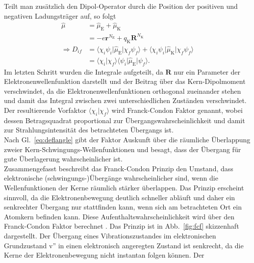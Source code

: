 Teilt man zusätzlich den Dipol-Operator durch die Position der positiven und negativen Ladungsträger auf,
so folgt
\begin{align}
    \hat{\mu}          & = \hat{\mu}_{\text{E}} + \hat{\mu}_{\text{K}}                                                          \\
                       & = -e\mathbf{r}^{N_{\text{E}}} + q_{\text{K}}\mathbf{R}^{N_{\text{K}}}                                  \\
    \Rightarrow D_{if} & = \langle\chi_{i}\psi_{i}\vert \hat{\mu}_{\text{E}} \vert\chi_{f}\psi_{f}\rangle +
    \langle\chi_{i}\psi_{i}\vert \hat{\mu}_{\text{K}} \vert\chi_{f}\psi_{f}\rangle                                              \\
                       & = \langle\chi_{i}\vert \chi_{f}\rangle \langle \psi_{i}\vert \hat{\mu}_{\text{E}}\vert\psi_{f}\rangle.
\end{align}
Im letzten Schritt wurden die Integrale aufgeteilt, da $\mathbf{R}$ nur ein Parameter der Elektronenwellenfunktion
darstellt und der Beitrag über das Kern-Dipolmoment verschwindet, da die Elektronenwellenfunktionen
orthogonal zueinander stehen und damit das Integral zwischen zwei unterschiedlichen Zuständen verschwindet. \\
Der resultierende Vorfaktor $\langle\chi_{i}\vert \chi_{f}\rangle$ wird Franck-Condon Faktor genannt,
wobei dessen Betragsquadrat proportional zur Übergangswahrscheinlichkeit und damit zur Strahlungsintensität
des betrachteten Übergangs ist. \\
Nach Gl.~\eqref{eq:deflangle} gibt der Faktor Auskunft über die räumliche Überlappung zweier Kern-Schwingungs-Wellenfunktionen
und besagt, dass der Übergang für gute Überlagerung wahrscheinlicher ist. \\
Zusammengefasst beschreibt das Franck-Condon Prinzip den Umstand, dass elektronische (schwingungs-)Übergänge
wahrscheinlicher sind, wenn die Wellenfunktionen der Kerne räumlich stärker überlappen. Das Prinzip erscheint sinnvoll,
da die Elektronenbewegung deutlich schneller abläuft und daher ein senkrechter Übergang nur stattfinden kann,
wenn sich am betrachteten Ort ein Atomkern befinden kann. Diese Aufenthaltswahrscheinlichkeit wird über den
Franck-Condon Faktor berechnet \cite{EPC,Demtroder,Parson}. Das Prinzip ist in Abb.~\ref{fig:fcf} skizzenhaft
dargestellt. Der Übergang eines Vibrationszustandes im elektronischen Grundzustand $\text{v''}$ in einen elektronisch
angeregten Zustand ist senkrecht, da die Kerne der Elektronenbewegung nicht instantan folgen können. Der
